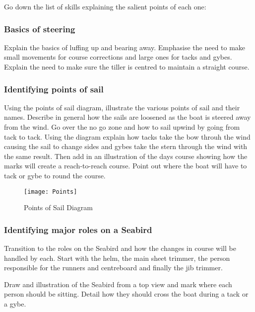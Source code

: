 \documentclass[12pt]{scrartcl}
\begin{document}
Go down the list of skills explaining the salient points of each one:

\subsubsection{Basics of steering} \label{subsubsection:basics of steering}

Explain the basics of luffing up and bearing away. Emphasise the need to make small movements for course corrections and large ones for tacks and gybes. Explain the need to make sure the tiller is centred to maintain a straight course.

\subsubsection{Identifying points of sail} \label{subsubsec:points of sail}

Using the points of sail diagram, illustrate the various points of sail and their names. Describe in general how the sails are loosened as the boat is steered away from the wind. Go over the no go zone and how to sail upwind by going from tack to tack. Using the diagram explain how tacks take the bow throuh the wind causing the sail to change sides and gybes take the stern through the wind with the same result. Then add in an illustration of the days course showing how the marks will create a reach-to-reach course. Point out where the boat will have to tack or gybe to round the course.

\label{fig:points of sail}
\begin{figure}[H]
	\centering
	\texttt{[image: Points]}
	\caption{Points of Sail Diagram}
\end{figure}

\subsubsection{Identifying major roles on a Seabird} \label{subsubsec:identifying major roles}

Transition to the roles on the Seabird and how the changes in course will be handled by each. Start with the helm, the main sheet trimmer, the person responsible for the runners and centreboard and finally the jib trimmer.

Draw and illustration of the Seabird from a top view and mark where each person should be sitting. Detail how they should cross the boat during a tack or a gybe.
\end{document}
